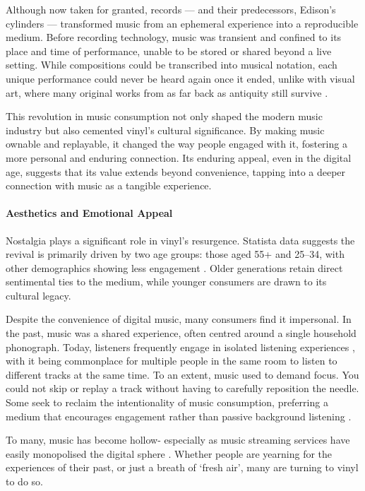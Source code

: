             Although now taken for granted, records — and their predecessors, Edison's cylinders — transformed music from an ephemeral experience into a reproducible medium. Before recording technology, music was transient and confined to its place and time of performance, unable to be stored or shared beyond a live setting. While compositions could be transcribed into musical notation, each unique performance could never be heard again once it ended, unlike with visual art, where many original works from as far back as antiquity still survive \cite{jdbond}.
    
            This revolution in music consumption not only shaped the modern music industry but also cemented vinyl’s cultural significance. By making music ownable and replayable, it changed the way people engaged with it, fostering a more personal and enduring connection. Its enduring appeal, even in the digital age, suggests that its value extends beyond convenience, tapping into a deeper connection with music as a tangible experience.
    
            \paragraph{Aesthetics and Emotional Appeal}
    
                Nostalgia plays a significant role in vinyl's resurgence. Statista data suggests the revival is primarily driven by two age groups: those aged 55+ and 25--34, with other demographics showing less engagement \cite{Gotting2021}. Older generations retain direct sentimental ties to the medium, while younger consumers are drawn to its cultural legacy.
    
                Despite the convenience of digital music, many consumers find it impersonal. In the past, music was a shared experience, often centred around a single household phonograph. Today, listeners frequently engage in isolated listening experiences \cite{historyandrevivalofvinyls}, with it being commonplace for multiple people in the same room to listen to different tracks at the same time. To an extent, music used to demand focus. You could not skip or replay a track without having to carefully reposition the needle. Some seek to reclaim the intentionality of music consumption, preferring a medium that encourages engagement rather than passive background listening \cite{Liu2020}.
    
                To many, music has become hollow- especially as music streaming services have easily monopolised the digital sphere \cite{historyandrevivalofvinyls}. Whether people are  yearning for the experiences of their past, or just a breath of `fresh air', many are turning to vinyl to do so.
    
